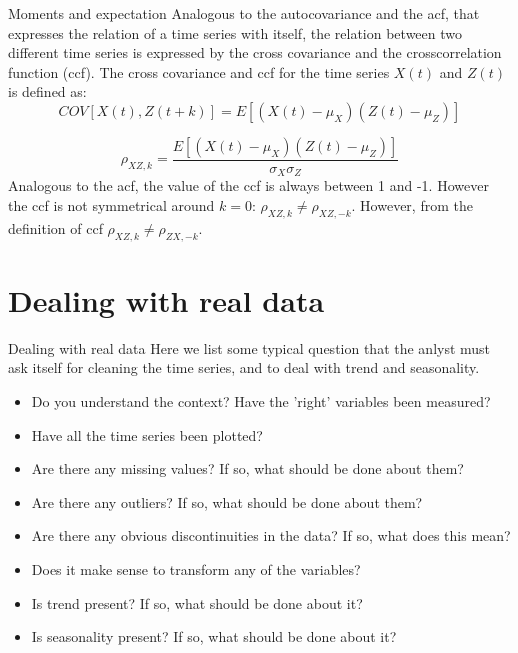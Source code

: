 \documentclass[8pt]{beamer}
\renewcommand{\emph}[1]{\textcolor{myorange}{#1}}
\begin{document}
\begin{frame}{Moments and expectation}
    Analogous to the \emph{autocovariance} and the \emph{acf}, that expresses the relation of a time series with itself, the relation between two different time series is expressed by the \emph{cross covariance} and the \emph{crosscorrelation function (ccf)}. The \emph{cross covariance} and \emph{ccf} for the time series $X(t)$ and $Z(t)$ is defined as:
    \[
        COV[X(t), Z(t+k)] = E\left[(X(t)-\mu_X) (Z(t)-\mu_Z)\right]
    \]

    \[
    \rho_{XZ,k} =\frac{E\left[(X(t)-\mu_X) (Z(t)-\mu_Z)\right]}{\sigma_X \sigma_Z}
\]
Analogous to the \emph{acf}, the value of the \emph{ccf} is always between 1 and
-1. However the \emph{ccf} is \emph{not symmetrical} around $k=0$: $\rho_{XZ,k}\neq\rho_{XZ,-k}$. However, from the definition of \emph{ccf} $\rho_{XZ,k}\neq\rho_{ZX,-k}$. 


\end{frame}

\section{Dealing with real data}
\begin{frame}{Dealing with real data}
    Here we list some typical question that the anlyst must ask itself for \emph{cleaning} the time series, and to deal with \emph{trend} and \emph{seasonality}.
    \begin{itemize}
        \item Do you \emph{understand} the context? Have the \emph{'right'} variables been \emph{measured}?
        \item Have all the time series been \emph{plotted}?
        \item Are there any \emph{missing values}? If so, what should be done about them? 
        \item Are there any \emph{outliers}? If so, what should be done about them?
        \item Are there any obvious \emph{discontinuities} in the data? If so, what does this mean?
        \item Does it make sense to \emph{transform} any of the variables?
        \item Is \emph{trend} present? If so, what should be done about it?
        \item Is \emph{seasonality} present? If so, what should be done about it?
           
        \end{itemize}
\end{frame}
\end{document}
